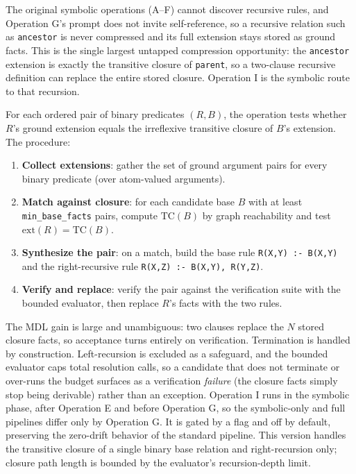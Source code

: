 \documentclass[10pt,conference]{IEEEtran}
\begin{document}
The original symbolic operations (A--F) cannot discover recursive rules, and Operation G's prompt does not invite self-reference, so a recursive relation such as \texttt{ancestor} is never compressed and its full extension stays stored as ground facts. This is the single largest untapped compression opportunity: the \texttt{ancestor} extension is exactly the transitive closure of \texttt{parent}, so a two-clause recursive definition can replace the entire stored closure. Operation I is the symbolic route to that recursion.

For each ordered pair of binary predicates $(R, B)$, the operation tests whether $R$'s ground extension equals the irreflexive transitive closure of $B$'s extension. The procedure:

\begin{enumerate}
\item \textbf{Collect extensions}: gather the set of ground argument pairs for every binary predicate (over atom-valued arguments).
\item \textbf{Match against closure}: for each candidate base $B$ with at least \texttt{min\_base\_facts} pairs, compute $\mathrm{TC}(B)$ by graph reachability and test $\mathrm{ext}(R) = \mathrm{TC}(B)$.
\item \textbf{Synthesize the pair}: on a match, build the base rule \texttt{R(X,Y) :- B(X,Y)} and the right-recursive rule \texttt{R(X,Z) :- B(X,Y), R(Y,Z)}.
\item \textbf{Verify and replace}: verify the pair against the verification suite with the bounded evaluator, then replace $R$'s facts with the two rules.
\end{enumerate}

The MDL gain is large and unambiguous: two clauses replace the $N$ stored closure facts, so acceptance turns entirely on verification. Termination is handled by construction. Left-recursion is excluded as a safeguard, and the bounded evaluator caps total resolution calls, so a candidate that does not terminate or over-runs the budget surfaces as a verification \emph{failure} (the closure facts simply stop being derivable) rather than an exception. Operation I runs in the symbolic phase, after Operation E and before Operation G, so the symbolic-only and full pipelines differ only by Operation G. It is gated by a flag and off by default, preserving the zero-drift behavior of the standard pipeline. This version handles the transitive closure of a single binary base relation and right-recursion only; closure path length is bounded by the evaluator's recursion-depth limit.
\end{document}
